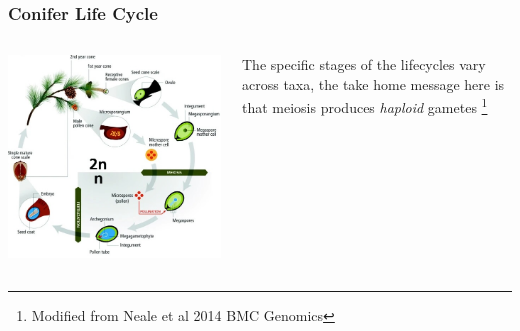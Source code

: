 \documentclass{beamer}
\newcommand\blfootnote[1]{%
	\begingroup
	\renewcommand\thefootnote{}\footnote{#1}%
	\addtocounter{footnote}{-1}%
	\endgroup
}
\begin{document}
\begin{frame}
	\frametitle{Conifer Life Cycle}
	\begin{columns}
	\begin{column}{0.8\textwidth}
	\includegraphics[keepaspectratio, width  =\textwidth]{img/coniferLifeCycle}
	\end{column}
	\begin{column}{0.3\textwidth}
	\small 	 The specific stages of the lifecycles vary across taxa, the take home message here is that meiosis produces \textit{haploid} gametes	 \blfootnote{ Modified from Neale et al 2014 BMC Genomics}
	\end{column}
	\end{columns}

\end{frame}
\end{document}
